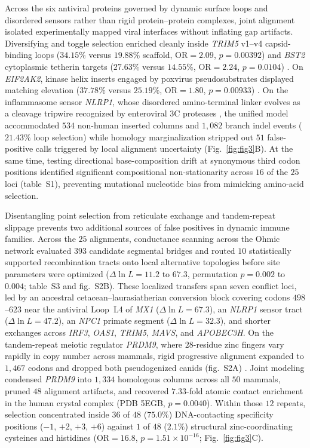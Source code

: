 \documentclass[12pt]{article}
\begin{document}
Across the six antiviral proteins governed by dynamic surface loops and disordered sensors rather than rigid protein--protein complexes, joint alignment isolated experimentally mapped viral interfaces without inflating gap artifacts. Diversifying and toggle selection enriched cleanly inside \textit{TRIM5} v1--v4 capsid-binding loops ($34.15\%$ versus $19.88\%$ scaffold, $\mathrm{OR} = 2.09$, $p = 0.00392$) and \textit{BST2} cytoplasmic tetherin targets ($27.63\%$ versus $14.55\%$, $\mathrm{OR} = 2.24$, $p = 0.0104$) \cite{tenthorey2020mutational,jia2009species,mcnatt2009species}. On \textit{EIF2AK2}, kinase helix inserts engaged by poxvirus pseudosubstrates displayed matching elevation ($37.78\%$ versus $25.19\%$, $\mathrm{OR} = 1.80$, $p = 0.00933$) \cite{elde2009protein}. On the inflammasome sensor \textit{NLRP1}, whose disordered amino-terminal linker evolves as a cleavage tripwire recognized by enteroviral 3C proteases \cite{chavarria2016proteolytic,tsu2021diverse}, the unified model accommodated $534$ non-human inserted columns and $1,082$ branch indel events ($21.43\%$ loop selection) while homology marginalization stripped out $51$ false-positive calls triggered by local alignment uncertainty (Fig.~\ref{fig:fig3}B). At the same time, testing directional base-composition drift at synonymous third codon positions identified significant compositional non-stationarity across $16$ of the $25$ loci (table~S1), preventing mutational nucleotide bias from mimicking amino-acid selection.

Disentangling point selection from reticulate exchange and tandem-repeat slippage prevents two additional sources of false positives in dynamic immune families. Across the $25$ alignments, conductance scanning across the Ohmic network evaluated $393$ candidate segmental bridges and routed $10$ statistically supported recombination tracts onto local alternative topologies before site parameters were optimized ($\Delta \ln L = 11.2$ to $67.3$, permutation $p = 0.002$ to $0.004$; table~S3 and fig.~S2B). These localized transfers span seven conflict loci, led by an ancestral cetacean--laurasiatherian conversion block covering codons $498$--$623$ near the antiviral Loop~L4 of \textit{MX1} ($\Delta \ln L = 67.3$), an \textit{NLRP1} sensor tract ($\Delta \ln L = 47.2$), an \textit{NPC1} primate segment ($\Delta \ln L = 32.3$), and shorter exchanges across \textit{IRF3}, \textit{OAS1}, \textit{TRIM5}, \textit{MAVS}, and \textit{APOBEC3H}. On the tandem-repeat meiotic regulator \textit{PRDM9}, where $28$-residue zinc fingers vary rapidly in copy number across mammals, rigid progressive alignment expanded to $1,467$ codons and dropped both pseudogenized canids (fig.~S2A) \cite{oliver2009prdm9,patel2016prdm9gene}. Joint modeling condensed \textit{PRDM9} into $1,334$ homologous columns across all $50$ mammals, pruned $48$ alignment artifacts, and recovered $7.33$-fold atomic contact enrichment in the human crystal complex (PDB 5EGB, $p = 0.0040$). Within those $12$ repeats, selection concentrated inside $36$ of $48$ ($75.0\%$) DNA-contacting specificity positions ($-1$, $+2$, $+3$, $+6$) against $1$ of $48$ ($2.1\%$) structural zinc-coordinating cysteines and histidines ($\mathrm{OR} = 16.8$, $p = 1.51 \times 10^{-16}$; Fig.~\ref{fig:fig3}C).
\end{document}
